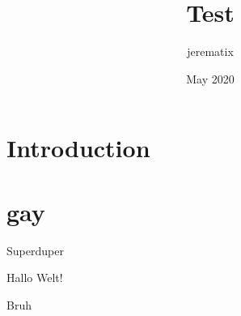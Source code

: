 \documentclass{article}
\title{Test}
\author{jerematix }
\date{May 2020}
\begin{document}
\maketitle

\section{Introduction}

\section{gay}

Superduper

Hallo Welt!

Bruh
\end{document}

